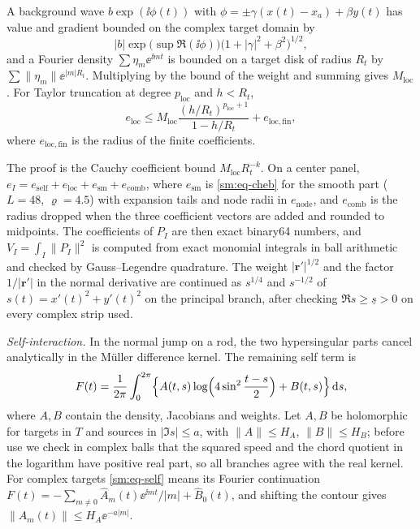 \begin{lemma}\label{sm:lem-local}
A background wave $b\exp(\ii\phi(t))$ with $\phi=\pm\gamma(x(t)-x_a)+\beta y(t)$ has
value and gradient bounded on the complex target domain by
\[
  |b|\exp\bigl(\sup\Re(\ii\phi)\bigr)\bigl(1+|\gamma|^2+\beta^2\bigr)^{1/2},
\]
and a Fourier density
$\sum\eta_m\ee^{\ii mt}$ is bounded on a target disk of radius $R_t$ by
$\sum\|\eta_m\|\ee^{|m|R_t}$. Multiplying by the bound of the weight and summing gives
$M_{\mathrm{loc}}$. For Taylor truncation at degree $p_{\mathrm{loc}}$ and $h<R_t$,
\[
  e_{\mathrm{loc}}\le M_{\mathrm{loc}}\frac{(h/R_t)^{p_{\mathrm{loc}}+1}}{1-h/R_t}
  +e_{\mathrm{loc,fin}},
\]
where $e_{\mathrm{loc,fin}}$ is the radius of the finite coefficients.
\end{lemma}

The proof is the Cauchy coefficient bound $M_{\mathrm{loc}}R_t^{-k}$. On a center
panel, $e_I=e_{\mathrm{self}}+e_{\mathrm{loc}}+e_{\mathrm{sm}}+e_{\mathrm{comb}}$, where
$e_{\mathrm{sm}}$ is \eqref{sm:eq-cheb} for the smooth part ($L=48$, $\varrho=4.5$)
with expansion tails and node radii in $e_{\mathrm{node}}$, and $e_{\mathrm{comb}}$ is
the radius dropped when the three coefficient vectors are added and rounded to
midpoints. The coefficients of $P_I$ are then exact binary64 numbers, and
$V_I=\int_I\|P_I\|^2$ is computed from exact monomial integrals in ball arithmetic
and checked by Gauss--Legendre quadrature. The weight $|\boldsymbol r'|^{1/2}$ and
the factor $1/|\boldsymbol r'|$ in the normal derivative are continued as $s^{1/4}$
and $s^{-1/2}$ of $s(t)=x'(t)^2+y'(t)^2$ on the principal branch, after checking
$\Re s\ge\underline s>0$ on every complex strip used.

\emph{Self-interaction.} In the normal jump on a rod, the two hypersingular parts
cancel analytically in the Müller difference kernel. The remaining self term is
\begin{equation}\label{sm:eq-self}
  F(t)=\frac1{2\pi}\int_0^{2\pi}\Bigl\{A(t,s)\log\Bigl(4\sin^2\frac{t-s}2\Bigr)+B(t,s)\Bigr\}\,\mathrm{d} s,
\end{equation}
where $A,B$ contain the density, Jacobians and weights. Let $A,B$ be holomorphic for
targets in $T$ and sources in $|\Im s|\le a$, with $\|A\|\le H_A$, $\|B\|\le H_B$;
before use we check in complex balls that the squared speed and the chord quotient
in the logarithm have positive real part, so all branches agree with the real
kernel. For complex targets \eqref{sm:eq-self} means its Fourier continuation
$F(t)=-\sum_{m\ne0}\widehat A_m(t)\ee^{\ii mt}/|m|+\widehat B_0(t)$, and shifting the
contour gives $\|\widehat A_m(t)\|\le H_A\ee^{-a|m|}$.

